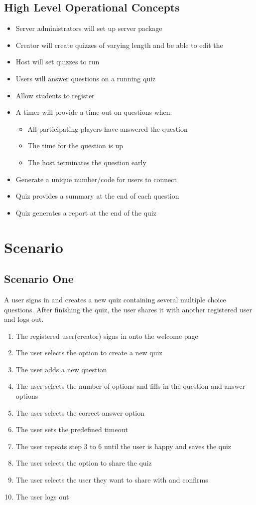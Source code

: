 \documentclass[a4paper]{article}
\begin{document}
	\subsection{High Level Operational Concepts}
	\begin{itemize}
		\item Server administrators will set up server package
		\item Creator will create quizzes of varying length and be able to edit the
		\item Host will set quizzes to run
		\item Users will answer questions on a running quiz
		\item Allow students to register
		\item A timer will provide a time-out on questions when:
		\begin{itemize}
			\item All participating players have answered the question
			\item The time for the question is up
			\item The host terminates the question early
		\end{itemize}
		\item Generate a unique number/code for users to connect
		\item Quiz provides a summary at the end of each question
		\item Quiz generates a report at the end of the quiz
	\end{itemize}	
	
	\newpage
	\section{Scenario}
	\subsection{Scenario One}
	A user signs in and creates a new quiz containing several multiple choice questions. After finishing the quiz, the user shares it with another registered user and logs out.	
	\begin{enumerate}
		\item The registered user(creator) signs in onto the welcome page
		\item The user selects the option to create a new quiz
		\item The user adds a new question
		\item The user selects the number of options and fills in the question and answer options
		\item The user selects the correct answer option
		\item The user sets the predefined timeout
		\item The user repeats step 3 to 6 until the user is happy and saves the quiz
		\item The user selects the option to share the quiz
		\item The user selects the user they want to share with and confirms
		\item The user logs out
	\end{enumerate}
\end{document}
